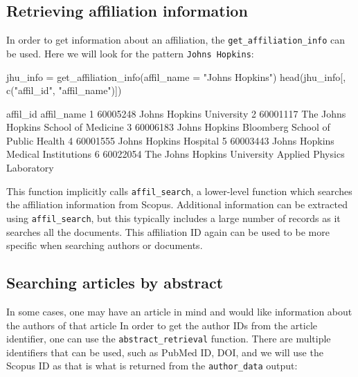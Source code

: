 \hypertarget{retrieving-affiliation-information}{%
\subsection{Retrieving affiliation
information}\label{retrieving-affiliation-information}}

In order to get information about an affiliation, the
\texttt{get\_affiliation\_info} can be used. Here we will look for the
pattern \texttt{Johns\ Hopkins}:

\begin{Schunk}
\begin{Sinput}
jhu_info = get_affiliation_info(affil_name = "Johns Hopkins")
head(jhu_info[, c("affil_id", "affil_name")])
\end{Sinput}
\begin{Soutput}
  affil_id                                              affil_name
1 60005248                                Johns Hopkins University
2 60001117                    The Johns Hopkins School of Medicine
3 60006183         Johns Hopkins Bloomberg School of Public Health
4 60001555                                  Johns Hopkins Hospital
5 60003443                      Johns Hopkins Medical Institutions
6 60022054 The Johns Hopkins University Applied Physics Laboratory
\end{Soutput}
\end{Schunk}

This function implicitly calls \texttt{affil\_search}, a lower-level
function which searches the affiliation information from Scopus.
Additional information can be extracted using \texttt{affil\_search},
but this typically includes a large number of records as it searches all
the documents. This affiliation ID again can be used to be more specific
when searching authors or documents.

\hypertarget{searching-articles-by-abstract}{%
\subsection{Searching articles by
abstract}\label{searching-articles-by-abstract}}

In some cases, one may have an article in mind and would like
information about the authors of that article In order to get the author
IDs from the article identifier, one can use the
\texttt{abstract\_retrieval} function. There are multiple identifiers
that can be used, such as PubMed ID, DOI, and we will use the Scopus ID
as that is what is returned from the \texttt{author\_data} output:

